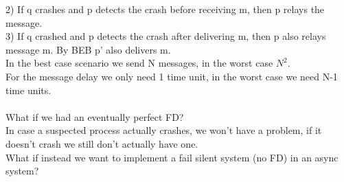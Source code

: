 \documentclass[11pt, a4paper]{article}
\begin{document}
2)	If q crashes and p detects the crash before receiving m, then p relays the message.\\
3)	If q crashed and p detects the crash after delivering m, then p also relays message m. By BEB p' also delivers m.\\
In the best case scenario we send N messages, in the worst case $N^2$.\\
For the message delay we only need 1 time unit, in the worst case we need N-1 time units.\\\\
What if we had an eventually perfect FD?\\
In case a suspected process actually crashes, we won't have a problem, if it doesn't crash we still don't actually have one.\\
What if instead we want to implement a fail silent system (no FD) in an async system?\\
\end{document}
